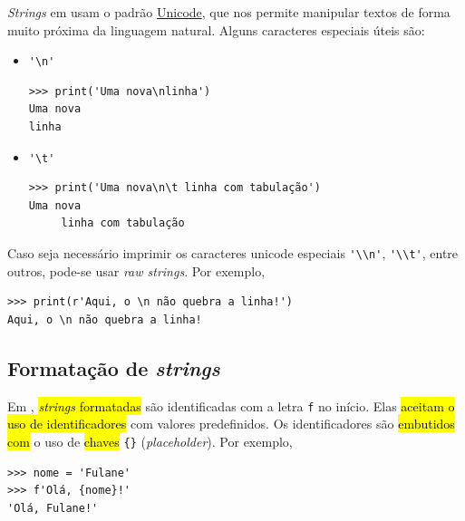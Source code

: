 \textit{Strings} em {\python} usam o padrão \href{https://home.unicode.org/}{Unicode}, que nos permite manipular textos de forma muito próxima da linguagem natural. Alguns caracteres especiais úteis são:
\begin{itemize}
\item \lstinline+'\n'+ 

\begin{lstlisting}[framexrightmargin=-2.5em]
>>> print('Uma nova\nlinha')
Uma nova
linha
\end{lstlisting}

\item \lstinline+'\t'+ 

\begin{lstlisting}[framexrightmargin=-2.5em]
>>> print('Uma nova\n\t linha com tabulação')
Uma nova
 	 linha com tabulação
\end{lstlisting}
\end{itemize}

\begin{obs}
  Caso seja necessário imprimir os caracteres unicode especiais \lstinline+'\\n'+, \lstinline+'\\t'+, entre outros, pode-se usar \textit{raw strings}. Por exemplo,

\begin{lstlisting}
>>> print(r'Aqui, o \n não quebra a linha!')
Aqui, o \n não quebra a linha!
\end{lstlisting}
\end{obs}

\subsection{Formatação de \textit{strings}}\label{cap_lingua_sec_string:subsec:format}

Em {\python}, \hl{\textit{strings} formatadas} são identificadas com a letra \lstinline+f+ no início. Elas \hl{aceitam o uso de identificadores} com valores predefinidos. Os identificadores são \hl{embutidos com} o uso de \hl{chaves} \lstinline+{}+ (\textit{placeholder}). Por exemplo,

\begin{lstlisting}
>>> nome = 'Fulane'
>>> f'Olá, {nome}!'
'Olá, Fulane!'
\end{lstlisting}

